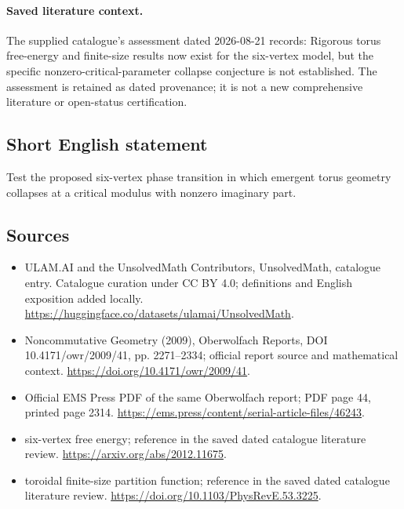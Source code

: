 \documentclass[11pt]{article}
\begin{document}
\paragraph{Saved literature context.} The supplied catalogue's assessment dated 2026-08-21 records: Rigorous torus free-energy and finite-size results now exist for the six-vertex model, but the specific nonzero-critical-parameter collapse conjecture is not established. The assessment is retained as dated provenance; it is not a new comprehensive literature or open-status certification.
\subsection{Short English statement}
Test the proposed six-vertex phase transition in which emergent torus geometry collapses at a critical modulus with nonzero imaginary part.
\subsection{Sources}
\begin{itemize}
\item[\hypertarget{source:statement:1}{S1}] ULAM.AI and the UnsolvedMath Contributors, UnsolvedMath, catalogue entry. Catalogue curation under CC BY 4.0; definitions and English exposition added locally.
\url{https://huggingface.co/datasets/ulamai/UnsolvedMath}.
\item[\hypertarget{source:statement:2}{S2}] Noncommutative Geometry (2009), Oberwolfach Reports, DOI 10.4171/owr/2009/41, pp. 2271--2334; official report source and mathematical context.
\url{https://doi.org/10.4171/owr/2009/41}.
\item[\hypertarget{source:statement:3}{S3}] Official EMS Press PDF of the same Oberwolfach report; PDF page 44, printed page 2314.
\url{https://ems.press/content/serial-article-files/46243}.
\item[\hypertarget{source:statement:4}{S4}] six-vertex free energy; reference in the saved dated catalogue literature review.
\url{https://arxiv.org/abs/2012.11675}.
\item[\hypertarget{source:statement:5}{S5}] toroidal finite-size partition function; reference in the saved dated catalogue literature review.
\url{https://doi.org/10.1103/PhysRevE.53.3225}.
\end{itemize}
\label{end:statement}
\end{document}
